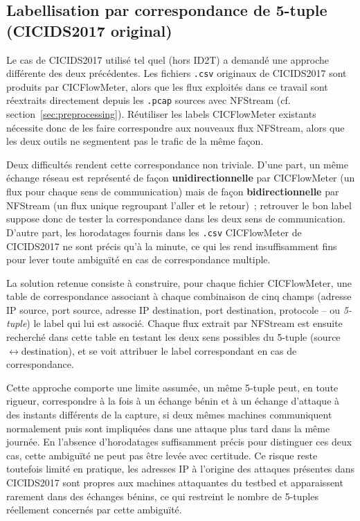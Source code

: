 \documentclass[12pt, a4paper]{report}
\begin{document}
\subsection{Labellisation par correspondance de 5-tuple (CICIDS2017 original)}

Le cas de CICIDS2017 utilisé tel quel (hors ID2T) a demandé une approche
différente des deux précédentes. Les fichiers \texttt{.csv} originaux de
CICIDS2017 sont produits par CICFlowMeter, alors que les flux exploités
dans ce travail sont réextraits directement depuis les
\texttt{.pcap} sources avec NFStream (cf. section~\ref{sec:preprocessing}).
Réutiliser les labels CICFlowMeter existants nécessite donc de les
faire correspondre aux nouveaux flux NFStream, alors que les deux outils
ne segmentent pas le trafic de la même façon.

Deux difficultés rendent cette correspondance non triviale. D'une part,
un même échange réseau est représenté de façon
\textbf{unidirectionnelle} par CICFlowMeter (un flux pour chaque sens
de communication) mais de façon \textbf{bidirectionnelle} par NFStream
(un flux unique regroupant l'aller et le retour)~; retrouver le bon
label suppose donc de tester la correspondance dans les deux sens de
communication. D'autre part, les horodatages fournis dans les
\texttt{.csv} CICFlowMeter de CICIDS2017 ne sont précis qu'à la minute,
ce qui les rend insuffisamment fins pour lever toute ambiguïté en cas
de correspondance multiple.

La solution retenue consiste à construire, pour chaque fichier
CICFlowMeter, une table de correspondance associant à chaque
combinaison de cinq champs (adresse IP source, port source, adresse IP
destination, port destination, protocole -- ou \textit{5-tuple}) le
label qui lui est associé. Chaque flux extrait par NFStream est ensuite
recherché dans cette table en testant les deux sens possibles du
5-tuple (source$\leftrightarrow$destination), et se voit attribuer le
label correspondant en cas de correspondance.

Cette approche comporte une limite assumée, un même 5-tuple peut, en
toute rigueur, correspondre à la fois à un échange bénin et à un
échange d'attaque à des instants différents de la capture, si deux
mêmes machines communiquent normalement puis sont impliquées dans une
attaque plus tard dans la même journée. En l'absence d'horodatages
suffisamment précis pour distinguer ces deux cas, cette ambiguïté ne
peut pas être levée avec certitude. Ce risque reste toutefois limité en
pratique, les adresses IP à l'origine des attaques présentes dans
CICIDS2017 sont propres aux machines attaquantes du testbed et
apparaissent rarement dans des échanges bénins, ce qui restreint le
nombre de 5-tuples réellement concernés par cette ambiguïté.
 
\end{document}
